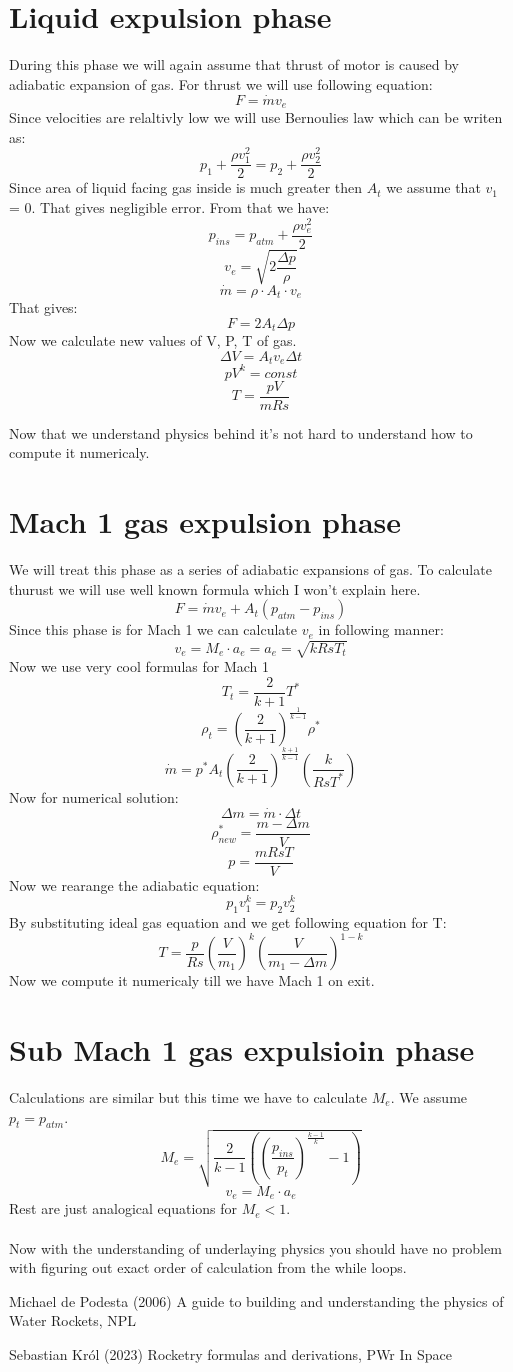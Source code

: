 \documentclass{report}
\begin{document}
\section{Liquid expulsion phase}
During this phase we will again assume that thrust of motor is caused by adiabatic expansion of gas. For thrust we will use following equation:
$$F = \dot{m} v_e$$
Since velocities are relaltivly low we will use Bernoulies law which can be writen as:
$$ p_1 + \frac{\rho v_1^2}{2} = p_2 + \frac{\rho v_2^2}{2} $$
Since area of liquid facing gas inside is much greater then $A_t$ we assume that $v_1$ = 0. That gives negligible error.  From that we have:
$$ p_{ins} = p_{atm} + \frac{\rho v_e^2}{2} $$
$$v_e = \sqrt{2\frac{\Delta p}{\rho}}$$
$$\dot{m} = \rho\cdot A_t\cdot v_e$$
That gives:
$$ F = 2 A_t \Delta p$$
Now we calculate new values of V, P, T of gas.
$$\Delta V = A_t v_e \Delta t$$
$$pV^k = const$$
$$ T = \frac{p V}{m Rs}$$

Now that we understand physics behind it's not hard to understand how to compute it numericaly.

\section{Mach 1 gas expulsion phase}
We will treat this phase as a series of adiabatic expansions of gas. To calculate thurust we will use well known formula which I won't explain here.
$$F = \dot{m}v_e + A_t(p_{atm} - p_{ins})$$
Since this phase is for Mach 1 we can calculate $v_e$ in following manner:
$$v_e = M_e\cdot a_e = a_e = \sqrt{kRsT_t}$$
Now we use very cool formulas for Mach 1
$$T_t = \frac{2}{k+1}T^*$$
$$\rho_t = \left(\frac{2}{k+1}\right)^{\frac{1}{k-1}}\rho^*$$
$$\dot{m} = p^* A_t\left(\frac{2}{k+1}\right)^{\frac{k+1}{k-1}}\left(\frac{k}{RsT^*}\right)$$
Now for numerical solution:
$$\Delta m = \dot{m} \cdot \Delta t$$
$$\rho^*_{new} = \frac{m-\Delta m}{V}$$
$$p = \frac{mRsT}{V}$$
Now we rearange the adiabatic equation:
$$p_1v_1^k = p_2v_2^k$$ 
By substituting ideal gas equation and we get following equation for T:
$$T = \frac{p}{Rs}\left(\frac{V}{m_1}\right)^k\left(\frac{V}{m_1 - \Delta m}\right)^{1-k}$$
Now we compute it numericaly till we have Mach 1 on exit.

\section{Sub Mach 1 gas expulsioin phase}
Calculations are similar but this time we have to calculate $M_e$. We assume $p_t = p_{atm}$.
$$M_e = \sqrt{\frac{2}{k-1}\left(\left(\frac{p_{ins}}{p_t}\right)^{\frac{k-1}{k}}-1\right)}$$
$$v_e = M_e\cdot a_e$$
Rest are just analogical equations for $M_e < 1$.\\\\
Now with the understanding of underlaying physics you should have no problem with figuring out exact order of calculation from the while loops.

\begin{thebibliography}{9}
Michael de Podesta (2006) A guide to building and understanding the physics of Water Rockets, NPL

Sebastian Król (2023) Rocketry formulas and derivations, PWr In Space
\end{thebibliography}
\end{document}
